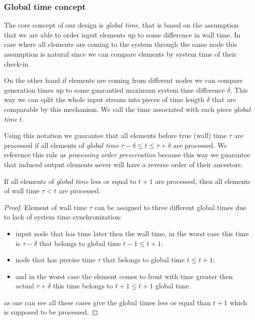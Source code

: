 \subsubsection{Global time concept}
\label{fs-acker-gt}
The core concept of our design is \textit{global time}, that is based on the assumption that we are able to order input elements up to some difference in wall time. In case where all elements are coming to the system through the same node this assumption is natural since we can compare elements by system time of their check-in.

On the other hand if elements are coming from different nodes we can compare generation times up to some guarantied maximum system time difference $\delta$. This way we can split the whole input stream into pieces of time length $\delta$ that are comparable by this mechanism. We call the time associated with each piece \textit{global time} $t$.

Using this notation we guarantee that all elements before true (wall) time $\tau$ are processed if all elements of \textit{global time} $\tau - \delta \le t \le \tau + \delta$ are processed. We reference this rule as \textit{processing order preservation} because this way we guarantee that induced output elements never will have a reverse order of their ancestors.

\begin{lemma}
\label{gt-lemma}
If all elements of \textit{global time} less or equal to $t + 1$ are processed, then all elements of wall time $\tau < t$ are processed.
\end{lemma}
\begin{proof}
Element of wall time $\tau$ can be assigned to three different global times due to lack of system time synchronization:
\begin{itemize}
    \item input node that has time later then the wall time, in the worst case this time is $\tau - \delta$ that belongs to global time $t - 1 \le t + 1$;
    \item node that has precise time $\tau$ that belongs to global time $t \le t + 1$;
    \item and in the worst case the element comes to front with time greater then actual $\tau + \delta$ this time belongs to $t + 1 \le t + 1$ global time.
\end{itemize}
as one can see all these cases give the global times less or equal than $t + 1$ which is supposed to be processed.
\end{proof}

